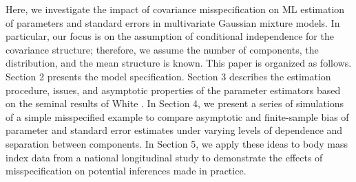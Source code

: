 \documentclass[10pt]{article}
\begin{document}
Here, we investigate the impact of covariance misspecification on ML estimation of parameters and standard errors in multivariate Gaussian mixture models. In particular, our focus is on the assumption of conditional independence for the covariance structure; therefore, we assume the number of components, the distribution, and the mean structure is known. This paper is organized as follows. Section 2 presents the model specification. Section 3 describes the estimation procedure, issues, and asymptotic properties of the parameter estimators based on the seminal results of White \cite{white1982}.  In Section 4, we present a series of simulations of a simple misspecified example to compare asymptotic and finite-sample bias of parameter and standard error estimates under varying levels of dependence and separation between components. In Section 5, we apply these ideas to body mass index data from a national longitudinal study to demonstrate the effects of misspecification on potential inferences made in practice. 
\end{document}
